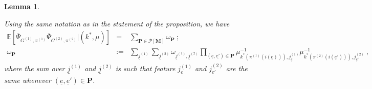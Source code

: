 \documentclass{article}
\newtheorem{lemma}{Lemma}
\begin{document}
            

            

            \begin{lemma}\label{lem:claim}
                
                Using the same notation as in the statement of the proposition, we have 
                \begin{eqnarray}\label{eq:cross12}
                    \mathbb{E}\left[\overline{\Psi}_{G^{(1)},\pi^{(1)}} \overline{\Psi}_{G^{(2)},\pi^{(2)}}\big|(k^*,\mu)\right]&=& \sum_{\mathbf{P} \in \mathcal{P}[\mathbf{M}]} \omega_{\mathbf{P} } \ ; \\
                    \omega_{\mathbf{P} }&:= &   \sum_{\underline{j}^{(1)}}\sum_{\underline{j}^{(2)}}\omega_{\underline{j}^{(1)},\underline{j}^{(2)}}\prod_{(\underline{e},\underline{e'} )\in\mathbf{P} }\mu^{-1}_{k^*(\pi^{(1)}(i(\underline{e}))),j^{(1)}_{\underline{e}}}\mu^{-1}_{k^*(\pi^{(2)}(i(\underline{e}'))),j^{(2)}_{\underline{e}'}} \ , 
                \end{eqnarray}
                where the sum over $\underline{j}^{(1)}$ and $\underline{j}^{(2)}$ is such that feature $j^{(1)}_{\underline{e}}$ and $j^{(2)}_{\underline{e}'}$ are the same whenever $(\underline{e},\underline{e}')\in \mathbf{P}$. 
                
                
               \end{lemma}
              
\end{document}
